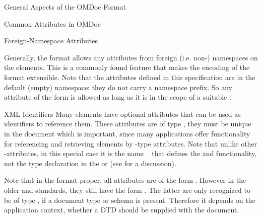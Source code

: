 \begin{tchapter}[id=spec-intro]{General Aspects of the OMDoc Format}
\begin{tsection}[id=common-attribs]{Common Attributes in OMDoc}
  \begin{tsubsection}[id=foreign-attribs]{Foreign-Namespace Attributes}

  Generally, the {\omdoc} format allows any attributes from foreign (i.e. non-{\omdoc})
  namespaces on the {\omdoc} elements. This is a commonly found
  feature that makes the {\xml} encoding of the {\omdoc} format extensible. Note that the
  attributes defined in this specification are in the default (empty)
  namespace: they do not carry a namespace
  prefix. So any attribute of the form {} is allowed as long as it is in
  the scope of a suitable {}.
\end{tsubsection}

\begin{tsubsection}[id=identifiers]{XML Identifiers}
  Many {\omdoc} elements have optional {} attributes that
  can be used as identifiers to reference them. These attributes are of type
  {}, they must be unique in the document which is important,
  since many {\xml} applications offer functionality for
  referencing and retrieving elements by {}-type attributes.
  Note that unlike other {}{}-attributes, in this special case
  it is the name {}~\cite{XML:id05} that defines the
  {} and {} functionality, not the type
  declaration in the {} or {} (see
  {} for a discussion).

  Note that in the {\omdoc} format proper, all {} attributes are of the
  form {}. However in the older {\openmath} and {\mathml}
  standards, they still have the form {}. The latter are only
  recognized to be of type {}, if a document type or {\xml}schema is
  present. Therefore it depends on the application context, whether a DTD should be
  supplied with the {\omdoc} document.
\end{tsubsection}


\end{tsection}
\end{tchapter}
